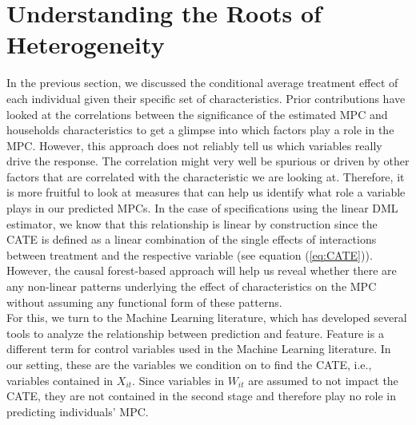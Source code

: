 \section{Understanding the Roots of Heterogeneity} \label{sec:roots_of_heterogeneity}
In the previous section, we discussed the conditional average treatment effect of each individual given their specific set of characteristics. Prior contributions have looked at the correlations between the significance of the estimated MPC and households characteristics to get a glimpse into which factors play a role in the MPC. However, this approach does not reliably tell us which variables really drive the response. The correlation might very well be spurious or driven by other factors that are correlated with the characteristic we are looking at. Therefore, it is more fruitful to look at measures that can help us identify what role a variable plays in our predicted MPCs. In the case of specifications using the linear DML estimator, we know that this relationship is linear by construction since the CATE is defined as a linear combination of the single effects of interactions between treatment and the respective variable (see equation (\ref{eq:CATE})). However, the causal forest-based approach will help us reveal whether there are any non-linear patterns underlying the effect of characteristics on the MPC without assuming any functional form of these patterns. \\
For this, we turn to the Machine Learning literature, which has developed several tools to analyze the relationship between prediction and feature. Feature is a different term for control variables used in the Machine Learning literature. In our setting, these are the variables we condition on to find the CATE, i.e., variables contained in $X_{it}$. Since variables in $W_{it}$ are assumed to not impact the CATE, they are not contained in the second stage and therefore play no role in predicting individuals' MPC.

